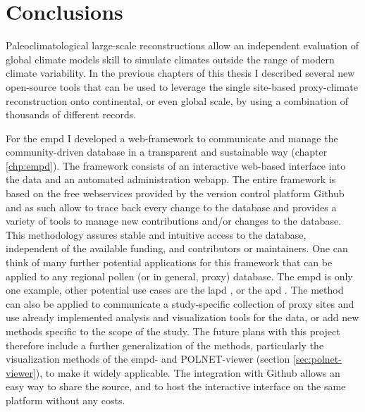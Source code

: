 
\chapter{Conclusions} 

\label{chp:conclusions}

\begin{refsection}

Paleoclimatological large-scale reconstructions allow an independent evaluation of global climate models skill to simulate climates outside the range of modern climate variability. In the previous chapters of this thesis I described several new open-source tools that can be used to leverage the single site-based proxy-climate reconstruction onto continental, or even global scale, by using a combination of thousands of different records. 

For the \gls{empd} \citep{DavisChevalierSommerEtAlinprep} I developed a web-framework to communicate and manage the community-driven database in a transparent and sustainable way (chapter \ref{chp:empd}). The framework consists of an interactive web-based interface into the data and an automated administration webapp. The entire framework is based on the free webservices provided by the version control platform Github and as such allow to trace back every change to the database and provides a variety of tools to manage new contributions and/or changes to the database. This methodology assures stable and intuitive access to the database, independent of the available funding, and contributors or maintainers. One can think of many further potential applications for this framework that can be applied to any regional pollen (or in general, proxy) database. The \gls{empd} is only one example, other potential use cases are the \gls{lapd} \citep{FlantuaHooghiemstraGrimmEtAl2015}, or the \gls{apd} \citep{VincensLezineBuchetEtAl2007}. The method can also be applied to communicate a study-specific collection of proxy sites and use already implemented analysis and visualization tools for the data, or add new methods specific to the scope of the study. The future plans with this project therefore include a further generalization of the methods, particularly the visualization methods of the \gls{empd}- and POLNET-viewer (section \ref{sec:polnet-viewer}), to make it widely applicable. The integration with Github allows an easy way to share the source, and to host the interactive interface on the same platform without any costs.


\end{refsection}
